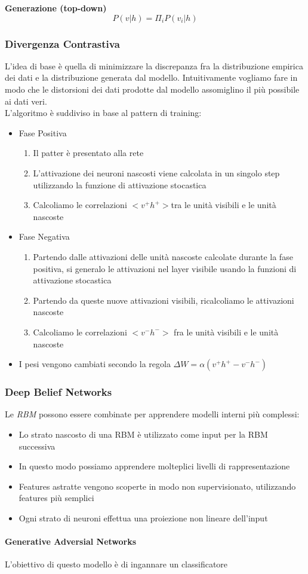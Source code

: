 \documentclass[12pt, a4paper]{article}
\begin{document}
\textbf{Generazione (top-down)}
\[P(v|h) = \Pi_i P(v_i|h)\]

\subsubsection{Divergenza Contrastiva}
L'idea di base è quella di minimizzare la discrepanza fra la distribuzione empirica dei dati e la distribuzione generata dal modello. Intuitivamente vogliamo fare in modo che le distorsioni dei dati prodotte dal modello assomiglino il più possibile ai dati veri.\\
L'algoritmo è suddiviso in base al pattern di training:
\begin{itemize}
    \item Fase Positiva
    \begin{enumerate}
        \item Il patter è presentato alla rete
        \item L'attivazione dei neuroni nascosti viene calcolata in un singolo step utilizzando la funzione di attivazione stocastica
        \item Calcoliamo le correlazioni \(<v^+h^+>\)tra le unità visibili e le unità nascoste
    \end{enumerate}

    \item Fase Negativa
    \begin{enumerate}
        \item Partendo dalle attivazioni delle unità nascoste calcolate durante la fase positiva, si generalo le attivazioni nel layer visibile usando la funzioni di attivazione stocastica
        \item Partendo da queste nuove attivazioni visibili, ricalcoliamo le attivazioni nascoste
        \item Calcoliamo le correlazioni \(<v^-h^->\) fra le unità visibili e le unità nascoste
    \end{enumerate}

    \item I pesi vengono cambiati secondo la regola \(\Delta W = \alpha (v^+h^+ - v^-h^-)\)

\end{itemize}

\subsubsection{Deep Belief Networks}
Le \textit{RBM} possono essere combinate per apprendere modelli interni più complessi:
\begin{itemize}
    \item Lo strato nascosto di una RBM è utilizzato come input per la RBM successiva
    \item In questo modo possiamo apprendere molteplici livelli di rappresentazione
    \item Features astratte vengono scoperte in modo non supervisionato, utilizzando features più semplici
    \item Ogni strato di neuroni effettua una proiezione non lineare dell'input
\end{itemize}

\paragraph{Generative Adversial Networks}
L'obiettivo di questo modello è di ingannare un classificatore
\end{document}
